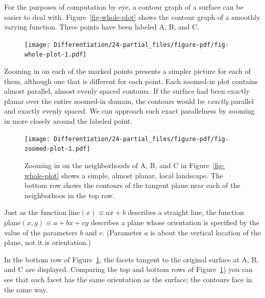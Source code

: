 \documentclass[
  letterpaper,
  DIV=11,
  numbers=noendperiod,
  oneside]{scrreprt}
\renewcommand{\line}{\text{line}}
\begin{document}
For the purposes of computation by eye, a contour graph of a surface can
be easier to deal with. Figure~\ref{fig-whole-plot} shows the contour
graph of a smoothly varying function. Three points have been labeled A,
B, and C.

\begin{figure}


{\centering \texttt{[image: Differentiation/24-partial\_files/figure-pdf/fig-whole-plot-1.pdf]}

}

\end{figure}

Zooming in on each of the marked points presents a simpler picture for
each of them, although one that is different for each point. Each
zoomed-in plot contains almost parallel, almost evenly spaced contours.
If the surface had been exactly planar over the entire zoomed-in domain,
the contours would be \emph{exactly} parallel and exactly evenly spaced.
We can approach such exact parallelness by zooming in more closely
around the labeled point.

\begin{figure}

{\centering \texttt{[image: Differentiation/24-partial\_files/figure-pdf/fig-zoomed-plot-1.pdf]}

}

\caption{\label{fig-zoomed-plot}Zooming in on the neighborhoods of A, B,
and C in Figure~\ref{fig-whole-plot} shows a simple, almost planar,
local landscape. The bottom row shows the contours of the tangent plane
near each of the neighborhoos in the top row.}

\end{figure}

Just as the function \(\line(x) \equiv a x + b\) describes a straight
line, the function \(\text{plane}(x, y) \equiv a + b x + c y\) describes
a plane whose orientation is specified by the value of the parameters
\(b\) and \(c\). (Parameter \(a\) is about the vertical location of the
plane, not it is orientation.)

In the bottom row of Figure~\ref{fig-zoomed-plot}, the facets tangent to
the original surface at A, B, and C are displayed. Comparing the top and
bottom rows of Figure~\ref{fig-zoomed-plot}) you can see that each facet
has the same orientation as the surface; the contours face in the same
way.
\end{document}

